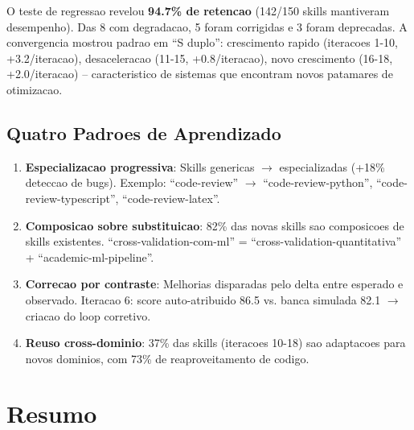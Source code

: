\documentclass[12pt,a4paper,oneside,sumario=tradicional,chapter=TITLE,section=TITLE,subsection=TITLE,english,brazil]{abntex2}
\begin{document}
O teste de regressao revelou \textbf{94.7\% de retencao} (142/150 skills mantiveram desempenho). Das 8 com degradacao, 5 foram corrigidas e 3 foram deprecadas. A convergencia mostrou padrao em ``S duplo'': crescimento rapido (iteracoes 1-10, +3.2/iteracao), desaceleracao (11-15, +0.8/iteracao), novo crescimento (16-18, +2.0/iteracao) -- caracteristico de sistemas que encontram novos patamares de otimizacao.

\subsection{Quatro Padroes de Aprendizado}

\begin{enumerate}[leftmargin=*]
  \item \textbf{Especializacao progressiva}: Skills genericas $\to$ especializadas (+18\% deteccao de bugs). Exemplo: ``code-review'' $\to$ ``code-review-python'', ``code-review-typescript'', ``code-review-latex''.
  \item \textbf{Composicao sobre substituicao}: 82\% das novas skills sao composicoes de skills existentes. ``cross-validation-com-ml'' = ``cross-validation-quantitativa'' + ``academic-ml-pipeline''.
  \item \textbf{Correcao por contraste}: Melhorias disparadas pelo delta entre esperado e observado. Iteracao 6: score auto-atribuido 86.5 vs. banca simulada 82.1 $\to$ criacao do loop corretivo.
  \item \textbf{Reuso cross-dominio}: 37\% das skills (iteracoes 10-18) sao adaptacoes para novos dominios, com 73\% de reaproveitamento de codigo.
\end{enumerate}

\section{Resumo}
\end{document}
